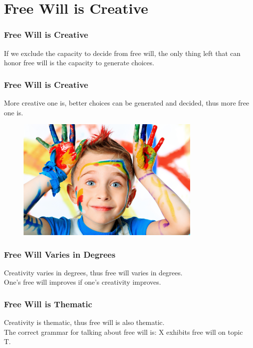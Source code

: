 \documentclass[xcolor=dvipsnames]{beamer}
\theoremstyle{definition}
\begin{document}
\section{Free Will is Creative} %
\label{sec:creative}

\begin{frame}[fragile]
  \frametitle{Free Will is Creative}

  If we exclude the \alert{capacity to decide} from free will, the only thing left that can honor free will is \alert{the capacity to generate choices}.
\end{frame}

\begin{frame}[fragile]
  \frametitle{Free Will is Creative}

  More creative one is, better choices can be generated and decided, thus more free one is.

  \begin{figure}
    \centering
    \includegraphics[width=0.8\textwidth]{images/creativity.jpg}\\
  \end{figure}
\end{frame}

\begin{frame}[fragile]
  \frametitle{Free Will Varies in Degrees}

  Creativity varies in degrees, thus free will \alert{varies in degrees}.\\[0.5cm]

  One's free will improves if one's creativity improves.
\end{frame}

\begin{frame}[fragile]
  \frametitle{Free Will is Thematic}

  Creativity is thematic, thus free will is also \alert{thematic}.\\[0.5cm]

  The correct grammar for talking about free will is: \alert{X exhibits free will on topic T}.
\end{frame}
\end{document}
